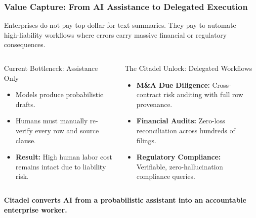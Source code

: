 \documentclass[aspectratio=169,11pt]{beamer}
\begin{document}
	\begin{frame}
		\frametitle{Value Capture: From AI Assistance to Delegated Execution}
		Enterprises do not pay top dollar for text summaries. They pay to automate high-liability workflows where errors carry massive financial or regulatory consequences.

		\begin{columns}[T]
			\begin{block}{Current Bottleneck: Assistance Only}
				\begin{itemize}
					\item Models produce probabilistic drafts.
					\item Humans must manually re-verify every row and source clause.
					\item \textbf{Result:} High human labor cost remains intact due to liability risk.
				\end{itemize}
			\end{block}

			\begin{block}{The Citadel Unlock: Delegated Workflows}
				\begin{itemize}
					\item \textbf{M\&A Due Diligence:} Cross-contract risk auditing with full row provenance.
					\item \textbf{Financial Audits:} Zero-loss reconciliation across hundreds of filings.
					\item \textbf{Regulatory Compliance:} Verifiable, zero-hallucination compliance queries.
				\end{itemize}
			\end{block}
		\end{columns}
		\vfill
		\centering
		{\color{CitadelHighlight}\bfseries Citadel converts AI from a probabilistic assistant into an accountable enterprise worker.}
	\end{frame}
\end{document}
